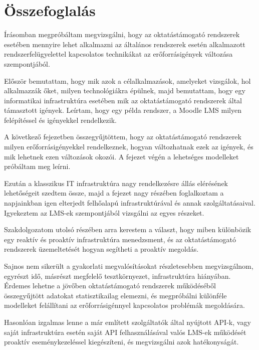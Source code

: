 \chapter{Összefoglalás}

Írásomban megpróbáltam megvizsgálni, hogy az oktatástámogató rendszerek esetében mennyire lehet alkalmazni az általános rendszerek esetén alkalmazott rendszerfelügyelettel kapcsolatos technikákat az erőforrásigények változása szempontjából.

Először bemutattam, hogy mik azok a célalkalmazások, amelyeket vizsgálok, hol alkalmazzák őket, milyen technológiákra épülnek, majd bemutattam, hogy egy informatikai infrastruktúra esetében mik az oktatástámogató rendszerek által támasztott igények. Leírtam, hogy egy példa rendszer, a Moodle LMS milyen felépítéssel és igényekkel rendelkezik.

A következő fejezetben összegyűjtöttem, hogy az oktatástámogató rendszerek milyen erőforrásigényekkel rendelkeznek, hogyan változhatnak ezek az igények, és mik lehetnek ezen változások okozói. A fejezet végén a lehetséges modelleket próbáltam meg leírni.

Ezután a klasszikus IT infrastruktúra nagy rendelkezésre állás elérésének lehetőségeit szedtem össze, majd a fejezet nagy részében foglalkoztam a napjainkban igen elterjedt felhőalapú infrastruktúrával és annak szolgáltatásaival. Igyekeztem az LMS-ek szempontjából vizsgálni az egyes részeket.

Szakdolgozatom utolsó részében arra kerestem a választ, hogy miben különbözik egy reaktív és proaktív infrastruktúra menedzsment, és az oktatástámogató rendszerek üzemeltetését hogyan segítheti a proaktív megoldás.

Sajnos nem sikerült a gyakorlati megvalósításokat részletesebben megvizsgálnom, egyrészt idő, másrészt megfelelő tesztkörnyezet, infrastruktúra hiányában. Érdemes lehetne a jövőben oktatástámogató rendszerek működéséből összegyűjtött adatokat statisztikailag elemezni, és megpróbálni különféle modelleket felállítani az erőforrásigénnyel kapcsolatos problémák megoldására.

Hasonlóan izgalmas lenne a már említett szolgáltatók által nyújtott API-k, vagy saját infrastruktúra esetén saját API felhasználásával valós LMS-ek működését proaktív eseménykezeléssel kiegészíteni, és megvizsgálni azok hatékonyságát.
